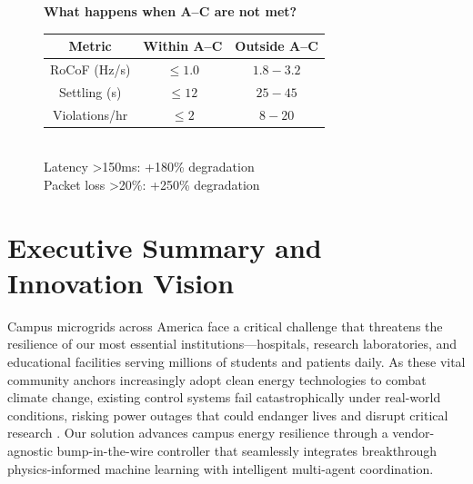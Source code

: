 \documentclass[12pt]{article}
\begin{document}
\begin{figure}[H]
\centering
\begin{minipage}{0.48\textwidth}
\centering
\textbf{What happens when A--C are not met?}
\begin{tabular}{|c|c|c|}
\hline
\textbf{Metric} & \textbf{Within A--C} & \textbf{Outside A--C} \\
\hline
RoCoF (Hz/s) & $\leq 1.0$ & $1.8-3.2$ \\
\hline
Settling (s) & $\leq 12$ & $25-45$ \\
\hline
Violations/hr & $\leq 2$ & $8-20$ \\
\hline
\end{tabular}
\vspace{0.2cm}
\\
\small{Latency >150ms: +180\% degradation}
\\
\small{Packet loss >20\%: +250\% degradation}
\end{minipage}
\end{figure}

\section{Executive Summary and Innovation Vision}

Campus microgrids across America face a critical challenge that threatens the resilience of our most essential institutions---hospitals, research laboratories, and educational facilities serving millions of students and patients daily. As these vital community anchors increasingly adopt clean energy technologies to combat climate change, existing control systems fail catastrophically under real-world conditions, risking power outages that could endanger lives and disrupt critical research \cite{molina2020,katiraei2008}. Our solution advances campus energy resilience through a vendor-agnostic bump-in-the-wire controller that seamlessly integrates breakthrough physics-informed machine learning with intelligent multi-agent coordination.

\begin{center}
\end{center}
\end{document}
